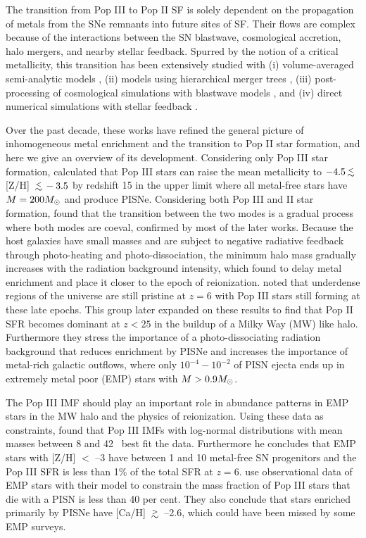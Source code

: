 \documentclass[apj]{emulateapj}
\begin{document}
The transition from Pop III to Pop II SF is solely dependent on the
propagation of metals from the SNe remnants into future sites of SF.
Their flows are complex because of the interactions between the SN
blastwave, cosmological accretion, halo mergers, and nearby stellar
feedback.  Spurred by the notion of a critical metallicity, this
transition has been extensively studied with (i) volume-averaged
semi-analytic models \citep{Scannapieco03, Yoshida04,
  Furlanetto05_Reion}, (ii) models using hierarchical merger trees
\citep{Tumlinson06, Tumlinson10, Salvadori07, Komiya10}, (iii)
post-processing of cosmological simulations with blastwave models
\citep{Karlsson08, Trenti09, Trenti10}, and (iv) direct numerical
simulations with stellar feedback \citep{Tornatore07, Ricotti08,
  Maio10_Pop32, Maio11_Enrich}.

Over the past decade, these works have refined the general picture of
inhomogeneous metal enrichment and the transition to Pop II star
formation, and here we give an overview of its development.
Considering only Pop III star formation, \citeauthor{Yoshida04}
calculated that Pop III stars can raise the mean metallicity to $-4.5
\lsim$ [Z/H] $\lsim -3.5$ by redshift 15 in the upper limit where all
metal-free stars have $M = 200 \Ms$ and produce PISNe.  Considering
both Pop III and II star formation, \citeauthor{Scannapieco03} found
that the transition between the two modes is a gradual process where
both modes are coeval, confirmed by most of the later works.  Because
the host galaxies have small masses and are subject to negative
radiative feedback through photo-heating and photo-dissociation, the
minimum halo mass gradually increases with the radiation background
intensity, which \citeauthor{Furlanetto05_Reion} found to delay metal
enrichment and place it closer to the epoch of reionization.
\citeauthor{Trenti09} noted that underdense regions of the universe
are still pristine at $z=6$ with Pop III stars still forming at these
late epochs.  This group later expanded on these results to find that
Pop II SFR becomes dominant at $z<25$ in the buildup of a Milky Way
(MW) like halo.  Furthermore they stress the importance of a
photo-dissociating radiation background that reduces enrichment by
PISNe and increases the importance of metal-rich galactic outflows,
where only $10^{-4} - 10^{-2}$ of PISN ejecta ends up in extremely
metal poor (EMP) stars with $M > 0.9 \Ms$.

The Pop III IMF should play an important role in abundance patterns in
EMP stars in the MW halo and the physics of reionization.  Using these
data as constraints, \citeauthor{Tumlinson06} found that Pop III IMFs
with log-normal distributions with mean masses between 8 and 42
\Ms~best fit the data.  Furthermore he concludes that EMP stars with
[Z/H] $<$ --3 have between 1 and 10 metal-free SN progenitors and
the Pop III SFR is less than 1\% of the total SFR at $z=6$.
\citeauthor{Karlsson08} use observational data of EMP stars with
their model to constrain the mass fraction of Pop III stars that
die with a PISN is less than 40 per cent.  They also conclude that
stars enriched primarily by PISNe have [Ca/H] $\gsim$ --2.6, which
could have been missed by some EMP surveys.
\end{document}
